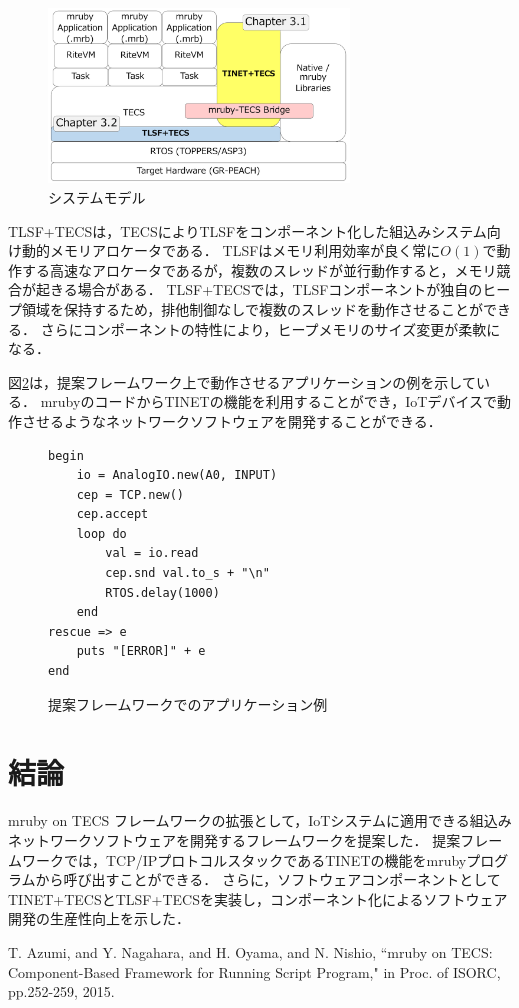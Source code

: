 \documentclass[a4j,10pt,twocolumn]{../styles/utf8/abstract}
\begin{document}
\begin{figure}[h]
    \centering
    \includegraphics[width=8cm,clip]{../figure/SystemModel.pdf}
    \vspace{-0.2cm}
    \caption{システムモデル}
    \vspace{-0.4cm}
    \label{fig:SystemModel}
\end{figure}

TLSF+TECSは，TECSによりTLSFをコンポーネント化した組込みシステム向け動的メモリアロケータである．
TLSFはメモリ利用効率が良く常に$O(1)$で動作する高速なアロケータであるが，複数のスレッドが並行動作すると，メモリ競合が起きる場合がある．
TLSF+TECSでは，TLSFコンポーネントが独自のヒープ領域を保持するため，排他制御なしで複数のスレッドを動作させることができる．
さらにコンポーネントの特性により，ヒープメモリのサイズ変更が柔軟になる．

図\ref{src:Application}は，提案フレームワーク上で動作させるアプリケーションの例を示している．
mrubyのコードからTINETの機能を利用することができ，IoTデバイスで動作させるようなネットワークソフトウェアを開発することができる．

\begin{figure}[t]
\centering
\begin{lstlisting}
begin
    io = AnalogIO.new(A0, INPUT)
    cep = TCP.new()
    cep.accept
    loop do
        val = io.read
        cep.snd val.to_s + "\n"
        RTOS.delay(1000)
    end
rescue => e
    puts "[ERROR]" + e
end
\end{lstlisting}
\vspace{-0.2cm}
\caption{提案フレームワークでのアプリケーション例}  
\vspace{-0.4cm}
\label{src:Application}
\end{figure}

\section{結論}

mruby on TECS フレームワークの拡張として，IoTシステムに適用できる組込みネットワークソフトウェアを開発するフレームワークを提案した．
提案フレームワークでは，TCP/IPプロトコルスタックであるTINETの機能をmrubyプログラムから呼び出すことができる．
さらに，ソフトウェアコンポーネントとしてTINET+TECSとTLSF+TECSを実装し，コンポーネント化によるソフトウェア開発の生産性向上を示した．

%
%
\begin{thebibliography}{1}
    T. Azumi, and Y. Nagahara, and H. Oyama, and N. Nishio, 
    ``mruby on TECS: Component-Based Framework for Running Script Program," 
    in Proc. of ISORC, 
    pp.252-259, 
    2015. 
\end{thebibliography}
\newpage
\pagebreak
\end{document}
